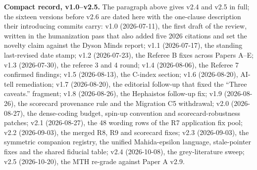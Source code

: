 \documentclass[11pt]{article}
\begin{document}
\textbf{Compact record, v1.0--v2.5.} The paragraph above gives v2.4 and v2.5 in full; the sixteen versions before v2.6 are dated here with the one-clause description their introducing commits carry: v1.0 (2026-07-11), the first draft of the review, written in the humanization pass that also added five 2026 citations and set the novelty claim against the Dyson Minds report; v1.1 (2026-07-17), the standing last-revised date stamp; v1.2 (2026-07-23), the Referee B fixes across Papers A--E; v1.3 (2026-07-30), the referee 3 and 4 round; v1.4 (2026-08-06), the Referee 7 confirmed findings; v1.5 (2026-08-13), the C-index section; v1.6 (2026-08-20), AI-tell remediation; v1.7 (2026-08-20), the editorial follow-up that fixed the ``Three caveats.'' fragment; v1.8 (2026-08-26), the Hephaistos follow-up fix; v1.9 (2026-08-26), the scorecard provenance rule and the Migration C5 withdrawal; v2.0 (2026-08-27), the dense-coding budget, spin-up convention and scorecard-robustness patches; v2.1 (2026-08-27), the 48 wording rows of the R7 application fix pool; v2.2 (2026-09-03), the merged R8, R9 and scorecard fixes; v2.3 (2026-09-03), the symmetric companion registry, the unified Mahida-epsilon language, stale-pointer fixes and the shared fiducial table; v2.4 (2026-10-08), the grey-literature sweep; v2.5 (2026-10-20), the MTH re-grade against Paper A v2.9.
\end{document}
